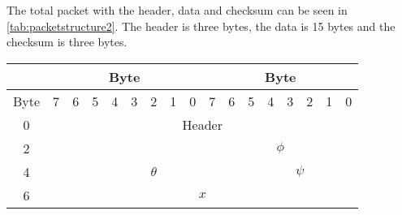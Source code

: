 The total packet with the header, data and checksum can be seen in \autoref{tab:packetstructure2}. The header is three bytes, the data is 15 bytes and the checksum is three bytes.
\begin{table}[H]
	\centering
	\begin{tabular}{lclllllllllllllll}
		\hline
		\multicolumn{1}{|c|}{}& \multicolumn{8}{c|}{Byte}                                                                                                                                                                           & \multicolumn{8}{c|}{Byte}                                                                                                                                                                                 \\ \hline
		\multicolumn{1}{|l|}{Byte} & \multicolumn{1}{c|}{7} & \multicolumn{1}{c|}{6} & \multicolumn{1}{c|}{5} & \multicolumn{1}{c|}{4} & \multicolumn{1}{c|}{3} & \multicolumn{1}{c|}{2} & \multicolumn{1}{c|}{1} & \multicolumn{1}{c|}{0} & \multicolumn{1}{|c|}{7} & \multicolumn{1}{c|}{6} & \multicolumn{1}{c|}{5} & \multicolumn{1}{c|}{4} & \multicolumn{1}{c|}{3} & \multicolumn{1}{c|}{2} & \multicolumn{1}{c|}{1} & \multicolumn{1}{c|}{0} \\ \hline
		\multicolumn{1}{|c|}{0}  & \multicolumn{16}{c|}{Header}                           \\ \hline
		\multicolumn{1}{|c|}{2}      & \multicolumn{8}{c|}{}                                                                                                                                                                                 & \multicolumn{8}{c|}{$\phi$}                                                                                                                                                                                 \\ \hline
		\multicolumn{1}{|c|}{4}    & \multicolumn{1}{c|}{}  & \multicolumn{9}{c|}{$\theta$}                         & \multicolumn{6}{c|}{$\psi$}                                                                                                                               \\ \hline
		\multicolumn{1}{|c|}{6}    & \multicolumn{3}{c|}{}                                                    & \multicolumn{10}{c|}{$x$}                                                                                                                                                                                                                                  & \multicolumn{3}{c|}{}                                                       \\ \hline

\end{tabular}
\end{table}
